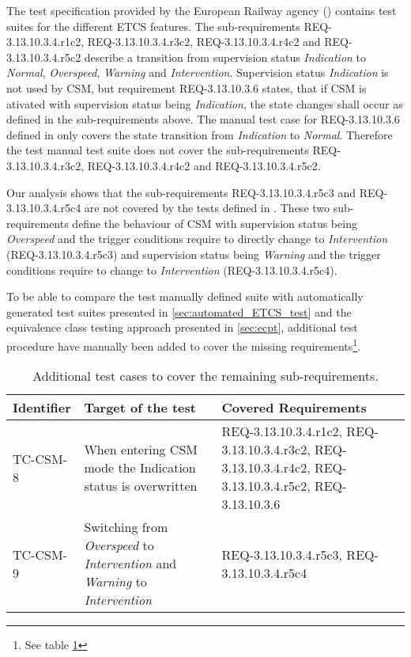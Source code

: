 The test specification provided by the European Railway agency (\cite{ETCS-Subset076})
contains test suites for the different ETCS features. The sub-requirements
REQ-3.13.10.3.4.r1c2, REQ-3.13.10.3.4.r3c2, REQ-3.13.10.3.4.r4c2 and REQ-3.13.10.3.4.r5c2
describe a transition from supervision status \emph{Indication} to \emph{Normal}, \emph{Overspeed}, \emph{Warning} and \emph{Intervention}.
Supervision status \emph{Indication} is not used by CSM, but requirement
REQ-3.13.10.3.6 states, that if CSM is ativated with supervision status
being \emph{Indication}, the state changes shall occur as defined in the
sub-requirements above.
The manual test case for REQ-3.13.10.3.6 defined in \cite{ETCS-Subset076}
only covers the state transition from \emph{Indication} to \emph{Normal}.
Therefore the test manual test suite does not cover the sub-requirements
REQ-3.13.10.3.4.r3c2, REQ-3.13.10.3.4.r4c2 and REQ-3.13.10.3.4.r5c2.

Our analysis shows that the sub-requirements REQ-3.13.10.3.4.r5c3 and
REQ-3.13.10.3.4.r5c4 are not covered by the tests defined in \cite{ETCS-Subset076}.
These two sub-requirements define the behaviour of CSM with
supervision status being \emph{Overspeed} and the trigger conditions
require to directly change to \emph{Intervention} (REQ-3.13.10.3.4.r5c3) and
supervision status being \emph{Warning} and the trigger conditions
require to change to \emph{Intervention} (REQ-3.13.10.3.4.r5c4).

To be able to compare the test manually defined suite with automatically
generated test suites presented in \ref{sec:automated_ETCS_test} and the equivalence class testing
approach presented in \ref{sec:ecpt}, additional test procedure have manually been added
to cover the missing requirements\footnote{See table \ref{tbl:extendedmanualtest}}.

\begin{table}
\tabsize
\renewcommand{\arraystretch}{1.2}
\caption{Additional test cases to cover the remaining sub-requirements.}
\label{tbl:extendedmanualtest}
\begin{tabular}{lp{}p{6.4cm}}
\hline\hline
Identifier & Target of the test & Covered Requirements \\
\hline
TC-CSM-8 & 
When entering CSM mode the Indication status is overwritten &
REQ-3.13.10.3.4.r1c2, REQ-3.13.10.3.4.r3c2,\newline
REQ-3.13.10.3.4.r4c2, REQ-3.13.10.3.4.r5c2,\newline
REQ-3.13.10.3.6 \\ \hline
TC-CSM-9 & 
Switching from \emph{Overspeed} to \emph{Intervention} and \emph{Warning} to \emph{Intervention}&
REQ-3.13.10.3.4.r5c3, REQ-3.13.10.3.4.r5c4 \\
\hline\hline
\end{tabular}
\normalsize
\end{table}
